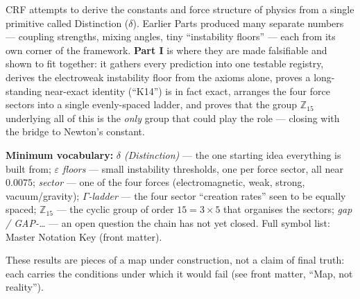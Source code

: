 \documentclass[12pt, a4paper]{article}
\begin{document}
\bigskip

\tableofcontents
\clearpage

\renewcommand{\tableofcontents}{}


\begin{keybox}[title={If you are just arriving --- Part I in plain language}]
\sloppy
CRF attempts to derive the constants and force structure of physics from a
single primitive called Distinction ($\delta$). Earlier Parts produced many
separate numbers --- coupling strengths, mixing angles, tiny ``instability
floors'' --- each from its own corner of the framework.
\textbf{Part I} is where they are made falsifiable and shown to fit together:
it gathers every prediction into one testable registry, derives the
electroweak instability floor from the axioms alone, proves a long-standing
near-exact identity (``K14'') is in fact exact, arranges the four force
sectors into a single evenly-spaced ladder, and proves that the group
$\mathbb{Z}_{15}$ underlying all of this is the \emph{only} group that could
play the role --- closing with the bridge to Newton's constant.

\textbf{Minimum vocabulary:}
\textit{$\delta$ (Distinction)} --- the one starting idea everything is built
from;\;
\textit{$\varepsilon$ floors} --- small instability thresholds, one per force
sector, all near $0.0075$;\;
\textit{sector} --- one of the four forces (electromagnetic, weak, strong,
vacuum/gravity);\;
\textit{$\Gamma$-ladder} --- the four sector ``creation rates'' seen to be
equally spaced;\;
\textit{$\mathbb{Z}_{15}$} --- the cyclic group of order $15=3\times5$ that
organises the sectors;\;
\textit{gap / GAP-\dots} --- an open question the chain has not yet closed.
Full symbol list: Master Notation Key (front matter).

These results are pieces of a map under construction, not a claim of final
truth: each carries the conditions under which it would fail (see front
matter, ``Map, not reality'').
\end{keybox}

\clearpage

\end{document}
